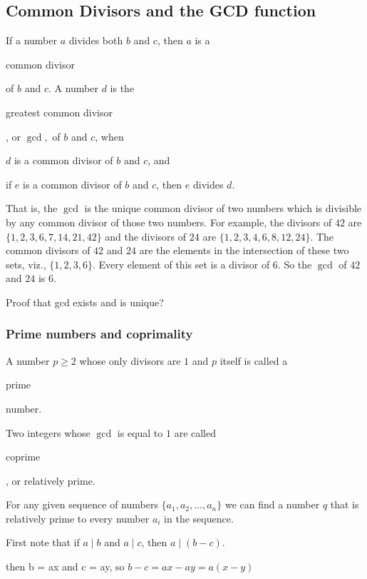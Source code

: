 \documentclass[11pt]{article}
\theoremstyle{plain}
\theoremstyle{definition}
\newenvironment{packed_items}{
\begin{itemize}
  \setlength{\itemsep}{1pt}
  \setlength{\parskip}{0pt}
  \setlength{\parsep}{0pt}
}{\end{itemize}}
\begin{document}
\subsection*{Common Divisors and the GCD function}

If a number $a$ divides both $b$ and $c$, then $a$ is a \begin{em}common divisor\end{em} of $b$ and $c$. A number $d$ is the \begin{em}greatest common divisor\end{em}, or $\gcd,$ of $b$ and $c$, when

\begin{packed_items}
  \item $d$ is a common divisor of $b$ and $c$, and
  \item if $e$ is a common divisor of $b$ and $c$, then $e$ divides $d.$
\end{packed_items}

That is, the $\gcd$ is the unique common divisor of two numbers which is divisible by any common divisor of those two numbers. For example, the divisors of $42$ are $\{ 1,2,3,6,7,14,21,42 \}$ and the divisors of $24$ are $\{ 1,2,3,4,6,8,12,24 \}$. The common divisors of $42$ and $24$ are the elements in the intersection of these two sets, viz., $\{ 1,2,3,6 \}$. Every element of this set is a divisor of $6$. So the $\gcd$ of $42$ and $24$ is $6.$

Proof that gcd exists and is unique?

\subsubsection*{Prime numbers and coprimality}

A number $p \ge 2$ whose only divisors are $1$ and $p$ itself is called a \begin{em}prime\end{em} number.

Two integers whose $\gcd$ is equal to $1$ are called \begin{em}coprime\end{em}, or relatively prime.

For any given sequence of numbers $\{a_1, a_2, \dots, a_n\}$ we can find a number $q$ that is relatively prime to every number $a_i$ in the sequence.


First note that if $a \mid b$ and $a \mid c$, then $a \mid (b - c)$.

then b = ax and c = ay, so $b - c = ax - ay = a(x - y)$
\end{document}

